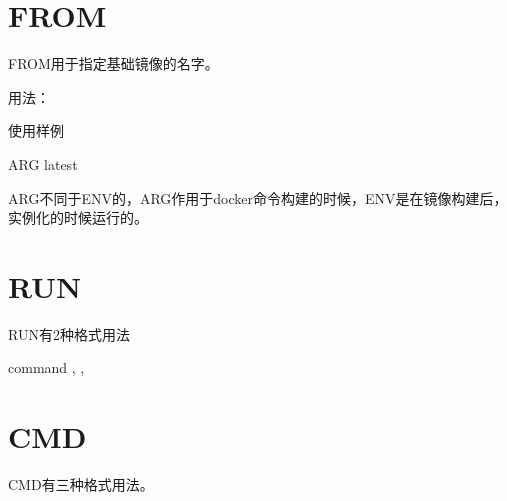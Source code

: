 \documentclass[letterpaper,10pt,english]{sphinxmanual}
\begin{document}
\section{FROM}
\label{\detokenize{_u8fd0_u884c_u5e94_u7528/05-dockerfile_u53c2_u8003:from}}
FROM用于指定基础镜像的名字。

用法：

%
\begin{sphinxVerbatim}[commandchars=\\\{\}]
\end{sphinxVerbatim}

使用样例

%
\begin{sphinxVerbatim}[commandchars=\\\{\}]
ARG  latest
\end{sphinxVerbatim}

ARG不同于ENV的，ARG作用于docker命令构建的时候，ENV是在镜像构建后，实例化的时候运行的。


\section{RUN}
\label{\detokenize{_u8fd0_u884c_u5e94_u7528/05-dockerfile_u53c2_u8003:run}}
RUN有2种格式用法

%
\begin{sphinxVerbatim}[commandchars=\\\{\}]
 \PYGZlt{}command\PYGZgt{}
 \PYG{o}{[}, , \PYG{o}{]}
\end{sphinxVerbatim}


\section{CMD}
\label{\detokenize{_u8fd0_u884c_u5e94_u7528/05-dockerfile_u53c2_u8003:cmd}}
CMD有三种格式用法。

%
\begin{sphinxVerbatim}[commandchars=\\\{\}]
\end{sphinxVerbatim}
\end{document}
